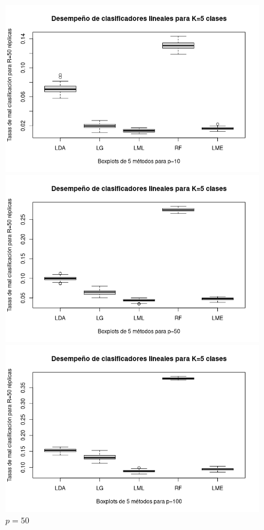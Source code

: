 \documentclass{report}
\begin{document}
  \begin{figure} [h]
  	\begin{multicols}{2}
  		\includegraphics[width=\linewidth]{5_clases_p10_sigma_I}\par 
  		\caption*{$p=10$}
  		\includegraphics[width=\linewidth]{5_clases_p50_sigma_I}\par 
  		\caption*{$p=50$}	 
  	\end{multicols}
  	\begin{multicols}{2}
  		\includegraphics[width=\linewidth]{5_clases_p100_sigma_I}\par

\end{multicols}
\end{figure}
\end{document}
